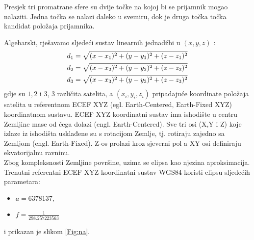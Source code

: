 \documentclass[a4paper,twoside,12pt]{memoir} %
\begin{document}
	Presjek tri promatrane sfere su dvije točke na kojoj bi se prijamnik mogao nalaziti.
	Jedna točka se nalazi daleko u svemiru, dok je druga točka točka kandidat položaja prijamnika. 
	
	Algebarski, rješavamo sljedeći sustav linearnih jednadžbi u $(x,y,z)$ :
	\begin{align}\label{eq:position2}
	 d_1 = \sqrt{(x-x_1)^{2}+(y-y_1)^{2}+(z-z_1)^{2}} \notag \\
	 d_2 = \sqrt{(x-x_2)^{2}+(y-y_2)^{2}+(z-z_2)^{2}} \\
	 d_3 = \sqrt{(x-x_3)^{2}+(y-y_3)^{2}+(z-z_3)^{2}} \notag
	\end{align}
	gdje su $1,2 \text{ i }3$,  3 različita satelita, a $(x_i,y_i,z_i)$ pripadajuće
	koordinate položaja satelita u referentnom ECEF XYZ (egl. Earth-Centered, Earth-Fixed XYZ) koordinatnom sustavu.
	ECEF XYZ koordinatni sustav ima ishodište u centru Zemljine mase od čega dolazi (engl. Earth-Centered).
	Sve tri osi (X,Y i Z) koje izlaze iz ishodišta usklađene su s rotacijom Zemlje, tj. rotiraju zajedno sa Zemljom (engl. Earth-Fixed).
	Z-os prolazi kroz sjeverni pol a XY osi definiraju ekvatorijalnu ravninu. \\
	Zbog kompleksnosti Zemljine površine, uzima se elipsa kao njezina aproksimacija.
	Trenutni referentni ECEF XYZ koordinatni sustav WGS84 koristi elipsu sljedećih parametara:%
	\begin{itemize}
		\item $a = 6378137$,
		\item $f = \frac{1}{298.257223563}$
	\end{itemize}
	i prikazan je slikom \ref{Fig:na}.
	
\end{document}
